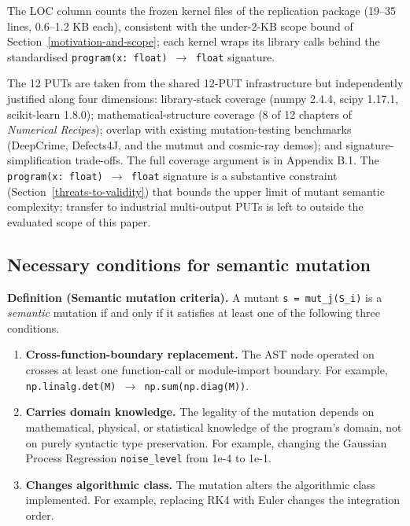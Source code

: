 \documentclass[review,12pt,authoryear]{elsarticle}
\begin{document}
The LOC column counts the frozen kernel files of the replication package
(19--35 lines, 0.6--1.2 KB each), consistent with the under-2-KB scope
bound of Section~\ref{motivation-and-scope}; each kernel wraps its
library calls behind the standardised \texttt{program(x: float)
$\to$ float} signature.

The 12 PUTs are taken from the shared 12-PUT infrastructure \citep{li2026minmrcomplete} but
independently justified along four dimensions: library-stack coverage
(numpy 2.4.4, scipy 1.17.1, scikit-learn 1.8.0); mathematical-structure
coverage (8 of 12 chapters of \emph{Numerical Recipes}); overlap with
existing mutation-testing benchmarks (DeepCrime, Defects4J, and the
mutmut and cosmic-ray demos); and signature-simplification trade-offs.
The full coverage argument is in Appendix B.1. The
\texttt{program(x:\ float)\ $\to$\ float} signature is a substantive
constraint (Section~\ref{threats-to-validity}) that bounds the upper limit of mutant semantic
complexity; transfer to industrial multi-output PUTs is left to
outside the evaluated scope of this paper.

\subsection{Necessary conditions for semantic mutation}\label{necessary-conditions-for-semantic-mutation-layer-1}

\textbf{Definition (Semantic mutation criteria).} A mutant
\texttt{s\textquotesingle{}\ =\ mut\_j(S\_i)} is a \emph{semantic}
mutation if and only if it satisfies at least one of the following three
conditions.

\begin{enumerate}
\item
  \textbf{Cross-function-boundary replacement.} The AST node operated on
  crosses at least one function-call or module-import boundary. For
  example, \texttt{np.linalg.det(M)\ $\to$\ np.sum(np.diag(M))}.
\item
  \textbf{Carries domain knowledge.} The legality of the mutation
  depends on mathematical, physical, or statistical knowledge of the
  program's domain, not on purely syntactic type preservation. For
  example, changing the Gaussian Process Regression
  \texttt{noise\_level} from 1e-4 to 1e-1.
\item
  \textbf{Changes algorithmic class.} The mutation alters the
  algorithmic class implemented. For example, replacing RK4 with Euler
  changes the integration order.
\end{enumerate}
\end{document}
